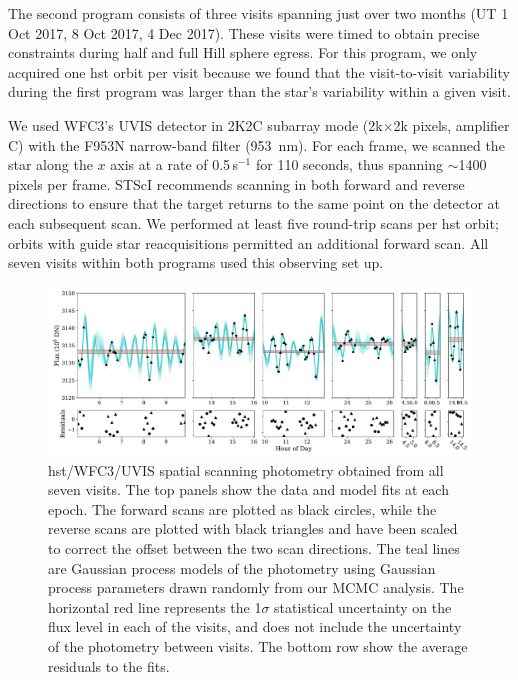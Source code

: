 \documentclass[longauth]{aa} %
\begin{document}
The second program consists of three visits spanning just over two months (UT 1 Oct 2017, 8 Oct 2017, 4 Dec 2017).
%
These visits were timed to obtain precise constraints during half and full Hill sphere egress.
%
For this program, we only acquired one \ac{hst} orbit per visit because we found that the visit-to-visit variability during the first program was larger than the star's variability within a given visit.

We used WFC3's UVIS detector in 2K2C subarray mode (2k$\times$2k pixels, amplifier C) with the F953N narrow-band filter (953~nm).
%
For each frame, we scanned the star along the $x$ axis at a rate of 0.5\arcsec\,s$^{-1}$ 
for 110 seconds, thus spanning $\sim$1400 pixels per frame.
%
STScI recommends scanning in both forward and reverse directions to ensure that the target returns to the same point on the detector at each subsequent scan.
%
We performed at least five round-trip scans per \ac{hst} orbit; orbits with guide star reacquisitions permitted an additional forward scan.  All seven visits within both programs used this observing set up. 

\begin{figure}
\includegraphics[width=1.0\textwidth]{hst_visitall-gpfit-maternperiodic.pdf}
\caption{\ac{hst}/WFC3/UVIS spatial scanning photometry obtained from all seven visits. The top panels show the data and model fits at each epoch. The forward scans are plotted as black circles, while the reverse scans are plotted with black triangles and have been scaled to correct the offset between the two scan directions. The teal lines are Gaussian process models of the photometry using Gaussian process parameters drawn randomly from our MCMC analysis. The horizontal red line represents the 1$\sigma$ statistical uncertainty on the flux level in each of the visits, and does not include the uncertainty of the photometry between visits. The bottom row show the average residuals to the fits.
\label{fig:visits}}
\end{figure}
\end{document}
